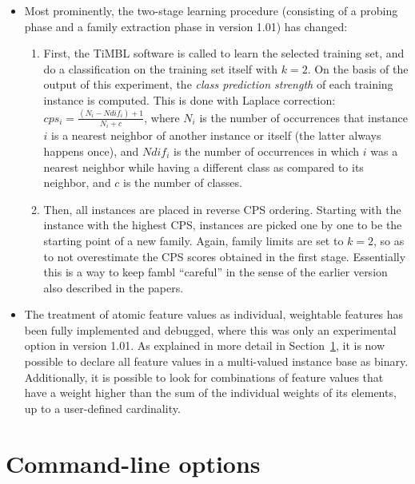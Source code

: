 \documentclass[11pt]{article}
\begin{document}
\begin{itemize}
\item
Most prominently, the two-stage learning procedure (consisting of a
probing phase and a family extraction phase in version 1.01) has changed:
        \begin{enumerate}
        \item
        First, the {\sc TiMBL} software is called to learn the selected
        training set, and do a classification on the training
        set itself with $k=2$. On the basis of the output of this
        experiment, the {\em class prediction strength}\/ of each
        training instance is computed. This is
        done with Laplace correction: $cps_{i} = 
        \frac{(N_{i}-Ndif_{i})+1}{N_{i}+c}$, where $N_{i}$ is the
        number of occurrences that instance $i$ is a nearest neighbor
        of another instance or itself (the latter always happens once),
        and $Ndif_{i}$ is the number of occurrences in which $i$ was
        a nearest neighbor while having a different class as compared
        to its neighbor, and $c$ is the number of classes.
        \item
        Then, all instances are placed in reverse CPS ordering. Starting
        with the instance with the highest CPS, instances are picked
        one by one to be the starting point of a new family. Again,
        family limits are set to $k=2$, so as to not overestimate the
        CPS scores obtained in the first stage. Essentially this is a way
        to keep {\sc fambl} ``careful'' in the sense of the earlier
        version also described in the papers.
        \end{enumerate}
\item
The treatment of atomic feature values as individual, weightable
features has been fully implemented and debugged, where this was only
an experimental option in version 1.01. As explained in more detail in
Section~\ref{command}, it is now possible to declare all feature
values in a multi-valued instance base as binary. Additionally, it is
possible to look for combinations of feature values that have a weight
higher than the sum of the individual weights of its elements, up to a
user-defined cardinality.
\end{itemize}


\section{Command-line options}
\label{command}
\end{document}
